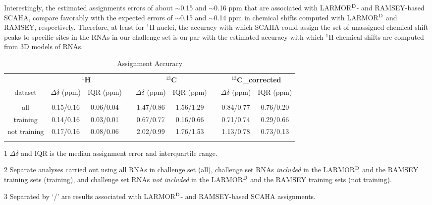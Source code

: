 \documentclass[journal=jcisd8,manuscript=article,layout=onecolumn]{achemso}
\begin{document}
Interestingly, the estimated assignments errors of about $\sim$0.15 and $\sim$0.16 ppm that are associated with LARMOR$^{\rm D}$- and RAMSEY-based SCAHA, compare favorably with the expected errors of $\sim$0.15\cite{frank2014simple} and $\sim$0.14 ppm\cite{frank2013prediction} in chemical shifts computed with LARMOR$^{\rm D}$ and RAMSEY, respectively. Therefore, at least for $^{1}$H nuclei, the accuracy with which SCAHA could assign the set of unassigned chemical shift peaks  to specific sites in the RNAs in our challenge set is on-par with the estimated accuracy with which $^{1}$H chemical shifts are computed from 3D models of RNAs.
\begin{table}[h!]
\centering
\caption{Assignment Accuracy}
\begin{threeparttable}
\begin{tabular}{c c c c c c c c c}
\toprule
{} &  \multicolumn{2}{c}{\textbf{$^{1}$H}} & {} & \multicolumn{2}{c}{\textbf{$^{13}$C}} & {} & \multicolumn{2}{c}{\textbf{$^{13}$C_{\rm corrected}}} \\   
dataset & $\Delta \delta$ (ppm) & IQR (ppm)  & {} & $\Delta \delta$ (ppm) & IQR (ppm) & {} & $\Delta \delta$ (ppm) & IQR (ppm)   \\
\hline
\\
all & 0.15/0.16 & 0.06/0.04 & {} & 1.47/0.86 & 1.56/1.29 & {} & 0.84/0.77 & 0.76/0.20 \\
training & 0.14/0.16 & 0.03/0.01 & {} & 0.67/0.77 & 0.16/0.66 & {} & 0.71/0.74 & 0.29/0.66 \\
not training & 0.17/0.16 & 0.08/0.06 & {} & 2.02/0.99 & 1.76/1.53 & {} & 1.13/0.78 & 0.73/0.13 \\
\\
\hline
\end{tabular}
\begin{tablenotes}
\item[1] $\Delta\delta$ and IQR is the median assignment error and interquartile range.
\item[2] Separate analyses carried out using all RNAs in challenge set (all), challenge set RNAs \textit{included} in the LARMOR$^{\rm D}$ and the RAMSEY training sets (training), and challenge set RNAs \textit{not included} in the LARMOR$^{\rm D}$ and the RAMSEY training sets (not training).
\item[3] Separated by `/' are  results associated with LARMOR$^{\rm D}$- and RAMSEY-based SCAHA assignments.

\end{tablenotes}
\end{threeparttable}
\label{tab:accuracy} 
\end{table}
\end{document}
